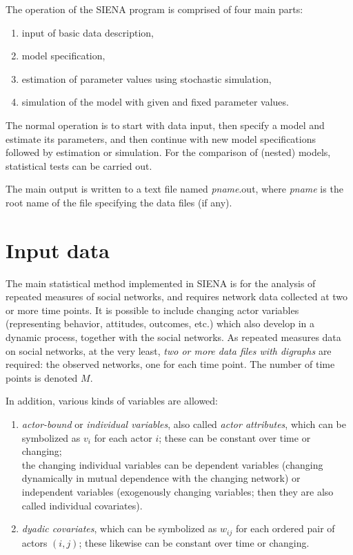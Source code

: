 \documentclass[a4paper,fleqn]{article}
\newcommand{\+}{\, + \,}
\newcommand{\SI}{{\sf SIENA }}
\begin{document}
{The operation of the \SI program is comprised of four main parts:
\begin{enumerate}
 \item input of basic data description,
 \item model specification,
 \item estimation of parameter values using stochastic simulation,
 \item simulation of the model with given and fixed parameter values.
\end{enumerate}

The normal operation is to start with data input, then specify a
model and estimate its parameters, and then continue with new
model specifications followed by estimation or simulation. For the
comparison of (nested) models, statistical tests can be carried out.


The main output is written to a text file named \textsf{{\em
pname}.out}, where \textsf{{\em pname}} is the root name of the
file specifying the data files (if any).

\begin{print}
\newpage
\end{print}

\section{Input data}
\label{S_InputData}

The main statistical method implemented in \SI  is for the analysis
of repeated measures of social networks, and requires network data
collected at two or more time points. It is possible to include
changing actor variables (representing behavior, attitudes,
outcomes, etc.) which also develop in a dynamic process, together
with the social networks.
As repeated measures data on social networks, at the very least, {\em two or more data
files with digraphs} are required: the observed networks, one for
each time point. The number of time points is denoted $M$.


In addition, various kinds of variables are allowed:

\begin{enumerate}
\item {\em actor-bound} or {\em individual variables},
      also called {\em actor attributes},
      which can be symbolized as $v_i$ for each actor $i$;
      these can be constant over time or changing; \\
      the changing individual variables can be dependent variables
      (changing dynamically in mutual dependence with the changing network)
      or independent variables (exogenously changing variables;
      then they are also called individual covariates).
\item {\em dyadic covariates}, which can be symbolized as $w_{ij}$
      for each ordered pair of actors $(i,j)$;
     these likewise can be constant over time or changing.
\end{enumerate}


}
\end{document}
